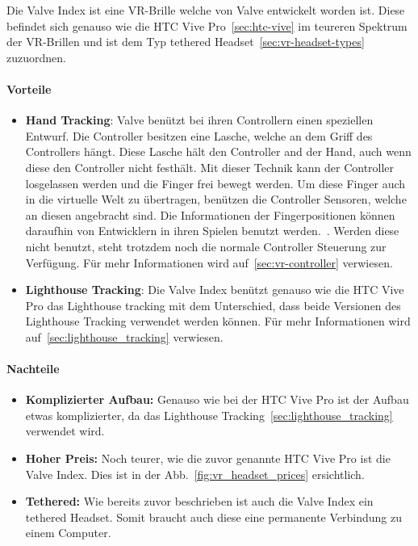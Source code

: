 Die Valve Index ist eine VR-Brille welche von Valve entwickelt worden ist.
Diese befindet sich genauso wie die HTC Vive Pro~\ref{sec:htc-vive} im teureren Spektrum~\cite{ALSOP_2019} der VR-Brillen und ist dem Typ tethered Headset~\ref{sec:vr-headset-types} zuzuordnen.

\paragraph{Vorteile}

\begin{itemize}
    \item \textbf{Hand Tracking}: Valve benützt bei ihren Controllern einen speziellen Entwurf.
    Die Controller besitzen eine Lasche, welche an dem Griff des Controllers hängt.
    Diese Lasche hält den Controller and der Hand, auch wenn diese den Controller nicht festhält.
    Mit dieser Technik kann der Controller losgelassen werden und die Finger frei bewegt werden.
    Um diese Finger auch in die virtuelle Welt zu übertragen, benützen die Controller Sensoren, welche an diesen angebracht sind.
    Die Informationen der Fingerpositionen können daraufhin von Entwicklern in ihren Spielen benutzt werden.~\cite{SadlyItsBradley_2019}.
    Werden diese nicht benutzt, steht trotzdem noch die normale Controller Steuerung zur Verfügung.
    Für mehr Informationen wird auf~\ref{sec:vr-controller} verwiesen.
    \item \textbf{Lighthouse Tracking}: Die Valve Index benützt genauso wie die HTC Vive Pro das Lighthouse tracking mit dem Unterschied, dass beide Versionen des Lighthouse Tracking verwendet werden können.
    Für mehr Informationen wird auf~\ref{sec:lighthouse_tracking} verwiesen.
\end{itemize}

\paragraph{Nachteile}

\begin{itemize}
    \item \textbf{Komplizierter Aufbau:} Genauso wie bei der HTC Vive Pro ist der Aufbau etwas komplizierter, da das Lighthouse Tracking~\ref{sec:lighthouse_tracking} verwendet wird.
    \item \textbf{Hoher Preis:} Noch teurer, wie die zuvor genannte HTC Vive Pro ist die Valve Index.
    Dies ist in der Abb.~\ref{fig:vr_headset_prices} ersichtlich.
    \item \textbf{Tethered:} Wie bereits zuvor beschrieben ist auch die Valve Index ein tethered Headset.
    Somit braucht auch diese eine permanente Verbindung zu einem Computer.
\end{itemize}

